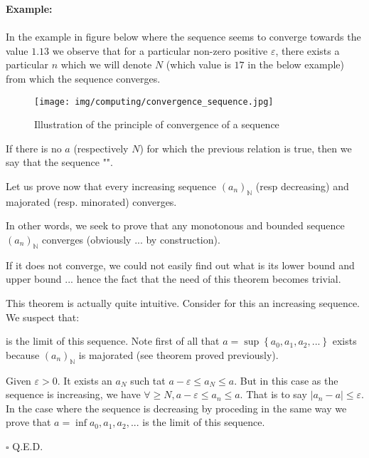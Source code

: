 	\pagebreak
	\begin{tcolorbox}[colframe=black,colback=white,sharp corners]
	\textbf{{\Large {}}Example:}\\\\
	In the example in figure below where the sequence seems to converge towards the value $1.13$ we observe that for a particular non-zero positive $\varepsilon$, there exists a particular $n$ which we will denote $N$ (which value is $17$ in the below example) from which the sequence converges.
	\begin{figure}[H]
		\centering
		\texttt{[image: img/computing/convergence\_sequence.jpg]}
		\caption{Illustration of the principle of convergence of a sequence}
	\end{figure}
	\end{tcolorbox}
		If there is no $a$ (respectively $N$) for which the previous relation is true, then we say that the sequence "".
	\begin{theorem}
	Let us prove now that every increasing sequence $(a_n)_\mathbb{N}$ (resp decreasing) and majorated (resp. minorated) converges.
	
	In other words, we seek to prove that any monotonous and bounded sequence $(a_n)_\mathbb{N}$ converges (obviously ... by construction).
	\begin{tcolorbox}[title=Remark,colframe=black,arc=10pt]
	If it does not converge, we could not easily find out what is its lower bound and upper bound ... hence the fact that the need of this theorem becomes trivial.
	\end{tcolorbox}
	\end{theorem}
	\begin{dem}
	This theorem is actually quite intuitive. Consider for this an increasing sequence. We suspect that:
	
	is the limit of this sequence. Note first of all that $a=\sup\left\lbrace a_0,a_1,a_2,...\right\rbrace$ exists because $(a_n)_\mathbb{N}$ is majorated (see theorem proved previously).
	
	Given $\varepsilon>0$. It exists an $a_N$ such tat $a-\varepsilon\leq a_N \leq a$. But in this case as the sequence is increasing, we have $\forall\geq N,a-\varepsilon\leq a_n\leq a$. That is to say $|a_n-a|\leq \varepsilon$. In the case where the sequence is decreasing by proceding in the same way we prove that $a=\inf{a_0,a_1,a_2,...}$ is the limit of this sequence.
	\begin{flushright}
		$\square$  Q.E.D.
	\end{flushright}
	\end{dem}
